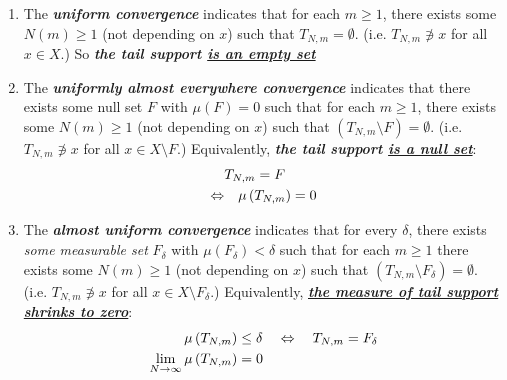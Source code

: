 \documentclass[11pt]{article}
\begin{document}
\begin{itemize}
\begin{remark}
\begin{enumerate}
\item The \emph{\textbf{uniform convergence}} indicates that for each $m\ge 1$, there exists some $N(m)\ge 1$ (not depending on $x$) such that $T_{N,m} = \emptyset$. (i.e. $T_{N,m} \not\ni x$ for all $x \in X$.) So \emph{\textbf{the tail support \underline{is an empty set}}}


\item The \emph{\textbf{uniformly almost everywhere convergence}} indicates that there exists some null set $F$ with $\mu(F) =0$ such that for each $m\ge 1$, there exists some $N(m)\ge 1$ (not depending on $x$) such that $(T_{N,m}  \setminus F) = \emptyset$. (i.e. $T_{N,m}\not\ni x$ for all $x \in X \setminus F$.) Equivalently, \emph{\textbf{the tail support \underline{is a null set}}}: 
\begin{align*}
& T_{N,m} = F \\
\Leftrightarrow &\quad \mu\left(T_{N,m}\right) = 0
\end{align*}


\item The \emph{\textbf{almost uniform convergence}}  indicates that for every $\delta$, there exists \emph{some measurable set} $F_{\delta}$ with $\mu(F_{\delta}) < \delta$ such that  for each $m\ge 1$ there exists some $N(m)\ge 1$ (not depending on $x$) such that $(T_{N,m} \setminus F_{\delta}) = \emptyset$. (i.e. $T_{N,m} \not\ni x$ for all $x \in X \setminus F_{\delta}$.) Equivalently, \emph{\textbf{\underline{the measure of  tail support shrinks to zero}}}:
\begin{align*}
\mu\left(T_{N,m}\right) &\le \delta  \quad \Leftrightarrow \quad T_{N,m} = F_\delta\\
\lim\limits_{N\rightarrow \infty}\mu\left(T_{N,m}\right) &=0
\end{align*} 



\end{enumerate}
\end{remark}
\end{itemize}
\end{document}
